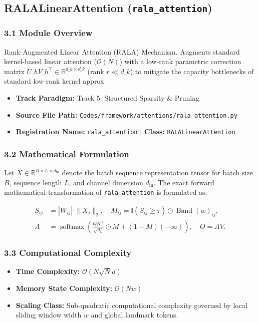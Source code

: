 \subsection{RALALinearAttention (\texttt{rala\_attention})}
\label{sec:app_module_rala\_attention}

\subsubsection*{3.1 Module Overview}
Rank-Augmented Linear Attention (RALA) Mechanism.  Augments standard kernel-based linear attention ($\mathcal{O}(N)$) with a low-rank parametric correction matrix $U\_h V\_h^\top \in \mathbb{R}^{d\_k \times d\_k}$ (rank $r \ll d\_k$) to mitigate the capacity bottlenecks of standard low-rank kernel approx
\begin{itemize}
    \item \textbf{Track Paradigm:} Track 5: Structured Sparsity & Pruning
    \item \textbf{Source File Path:} \texttt{Codes/framework/attentions/rala\_attention.py}
    \item \textbf{Registration Name:} \texttt{rala\_attention} $\mid$ \textbf{Class:} \texttt{RALALinearAttention}
\end{itemize}

\subsubsection*{3.2 Mathematical Formulation}
Let $X \in \mathbb{R}^{B \times L \times d_{\text{in}}}$ denote the batch sequence representation tensor for batch size $B$, sequence length $L$, and channel dimension $d_{\text{in}}$. The exact forward mathematical transformation of \texttt{rala\_attention} is formulated as:

\begin{align}
S_{ij} &= |W_{ij}| \cdot \|X_j\|_2, \quad M_{ij} = \mathbb{I}(S_{ij} \ge \tau) \odot \operatorname{Band}(w)_{ij}, \\
A &= \operatorname{softmax}\left(\frac{Q K^\top}{\sqrt{d_k}} \odot M + (1 - M)(-\infty)\right), \quad O = A V.
\end{align}


\subsubsection*{3.3 Computational Complexity}
\begin{itemize}
    \item \textbf{Time Complexity:} $\mathcal{O}(N \sqrt{N} d)$
    \item \textbf{Memory State Complexity:} $\mathcal{O}(N w)$
    \item \textbf{Scaling Class:} Sub-quadratic computational complexity governed by local sliding window width $w$ and global landmark tokens.
\end{itemize}

